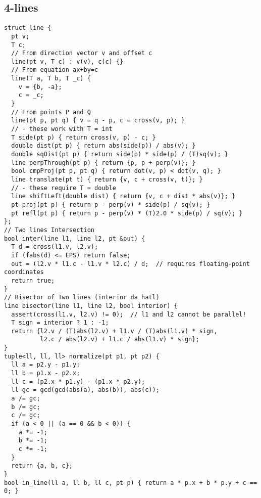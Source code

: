\documentclass[twoside]{article}
\begin{document}
\begin{multicols*}{2}
{\subsection*{4-lines}
}
\begin{verbatim}
struct line {
  pt v;
  T c;
  // From direction vector v and offset c
  line(pt v, T c) : v(v), c(c) {}
  // From equation ax+by=c
  line(T a, T b, T _c) {
    v = {b, -a};
    c = _c;
  }
  // From points P and Q
  line(pt p, pt q) { v = q - p, c = cross(v, p); }
  // - these work with T = int
  T side(pt p) { return cross(v, p) - c; }
  double dist(pt p) { return abs(side(p)) / abs(v); }
  double sqDist(pt p) { return side(p) * side(p) / (T)sq(v); }
  line perpThrough(pt p) { return {p, p + perp(v)}; }
  bool cmpProj(pt p, pt q) { return dot(v, p) < dot(v, q); }
  line translate(pt t) { return {v, c + cross(v, t)}; }
  // - these require T = double
  line shiftLeft(double dist) { return {v, c + dist * abs(v)}; }
  pt proj(pt p) { return p - perp(v) * side(p) / sq(v); }
  pt refl(pt p) { return p - perp(v) * (T)2.0 * side(p) / sq(v); }
};
// Two lines Intersection
bool inter(line l1, line l2, pt &out) {
  T d = cross(l1.v, l2.v);
  if (fabs(d) <= EPS) return false;
  out = (l2.v * l1.c - l1.v * l2.c) / d;  // requires floating-point coordinates
  return true;
}
// Bisector of Two lines (interior da hatl)
line bisector(line l1, line l2, bool interior) {
  assert(cross(l1.v, l2.v) != 0);  // l1 and l2 cannot be parallel!
  T sign = interior ? 1 : -1;
  return {l2.v / (T)abs(l2.v) + l1.v / (T)abs(l1.v) * sign,
          l2.c / abs(l2.v) + l1.c / abs(l1.v) * sign};
}
tuple<ll, ll, ll> normalize(pt p1, pt p2) {
  ll a = p2.y - p1.y;
  ll b = p1.x - p2.x;
  ll c = (p2.x * p1.y) - (p1.x * p2.y);
  ll gc = gcd(gcd(abs(a), abs(b)), abs(c));
  a /= gc;
  b /= gc;
  c /= gc;
  if (a < 0 || (a == 0 && b < 0)) {
    a *= -1;
    b *= -1;
    c *= -1;
  }
  return {a, b, c};
}
bool in_line(ll a, ll b, ll c, pt p) { return a * p.x + b * p.y + c == 0; }

\end{verbatim}

{
}
\end{multicols*}
\end{document}
